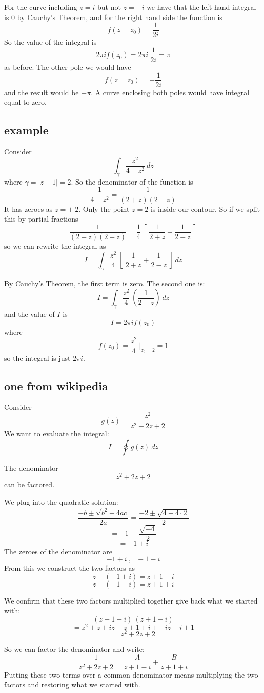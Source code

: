 \documentclass[11pt, oneside]{article}
\begin{document}
For the curve including $z = i$ but not $z = -i$ we have that the left-hand integral is 0 by Cauchy's Theorem, and for the right hand side the function is
\[ f(z = z_0) = \frac{1}{2i} \]
So the value of the integral is
\[ 2 \pi i f(z_0) = 2 \pi i \ \frac{1}{2i} = \pi \]
as before.  The other pole we would have
\[ f(z = z_0) = -\frac{1}{2i} \]
and the result would be $- \pi$.  A curve enclosing both poles would have integral equal to zero.

\subsection*{example}
Consider
\[ \int_{\gamma} \frac{z^2}{4-z^2} \ dz \]
where $\gamma = | z + 1 | = 2$.
So the denominator of the function is
\[ \frac{1}{4-z^2} = \frac{1}{(2+z)(2-z)} \]
It has zeroes as $z = \pm \ 2$.  Only the point $z = 2$ is inside our contour.  So if we split this by partial fractions
\[  \frac{1}{(2+z)(2-z)} = \frac{1}{4} \ [ \ \frac{1}{2+z} + \frac{1}{2-z} \ ] \]
so we can rewrite the integral as
\[ I = \int_{\gamma} \frac{z^2}{4} \ [ \ \frac{1}{2+z} + \frac{1}{2-z} \ ] \ dz \]

By Cauchy's Theorem, the first term is zero.  The second one is:
\[ I = \int_{\gamma} \frac{z^2}{4} \ ( \frac{1}{2-z} ) \ dz \]
and the value of $I$ is
\[ I = 2 \pi i f(z_0) \]
where 
\[ f(z_0) = \frac{z^2}{4}  \ \bigg |_{z_0 = 2} = 1 \]
so the integral is just $2 \pi i$.

\subsection*{one from wikipedia}
Consider
\[ g(z) = \frac{z^2}{z^2 + 2z + 2} \]
We want to evaluate the integral:
\[ I = \oint g(z) \ dz \]

The denominator
\[ z^2 + 2z + 2 \]
can be factored.

We plug into the quadratic solution:
\[ \frac{-b \pm \sqrt{b^2 - 4ac}}{2a} =  \frac{-2 \pm \sqrt{4 - 4 \cdot 2}}{2} \]
\[ = -1 \pm \  \frac{\sqrt{-4}}{2} \]
\[ = -1 \pm i \]
The zeroes of the denominator are
\[ - 1 + i \ , \ \ \ - 1 - i \]
From this we construct the two factors as
\[ z - (- 1 + i) = z + 1 - i \]
\[ z - (-1 - i) = z + 1 + i \]

We confirm that these two factors multiplied together give back what we started with:
\[ (z + 1 + i) \ (z + 1 - i) \]
\[ = z^2 + z + iz + z + 1 + i + -iz - i + 1 \] 
\[ = z^2 + 2z + 2 \]

So we can factor the denominator and write:
\[ \frac{1}{z^2 + 2z + 2} = \frac{A}{z + 1 - i} + \frac{B}{z + 1 + i}  \]
Putting these two terms over a common denominator means multiplying the two factors and restoring what we started with.
\end{document}

